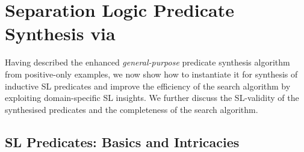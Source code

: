 
\section{Separation Logic Predicate Synthesis via \tool}
\label{sec:SLsynthesis}

Having described the enhanced \emph{general-purpose} predicate
synthesis algorithm from positive-only examples,
%
we now show how to instantiate it for synthesis of inductive SL
predicates and improve the efficiency of the search algorithm by
exploiting domain-specific SL insights. We further discuss the
SL-validity of the synthesised predicates and the completeness of the
search algorithm.

\subsection{SL Predicates: Basics and Intricacies}
\label{sec:default}
 
